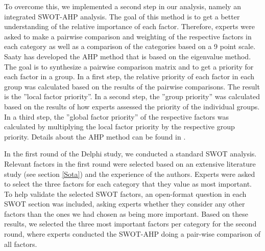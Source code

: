 To overcome this, we implemented a second step in our analysis, namely an integrated SWOT-AHP analysis. The goal of this method is to get a better understanding of the relative importance of each factor. 
Therefore, experts were asked to make a pairwise comparison and weighting of the respective factors in each category as well as a comparison of the categories based on a 9 point scale. 
Saaty \cite{Saaty1980} has developed the AHP method that is based on the eigenvalue method. 
The goal is to synthesize a pairwise comparison matrix and to get a priority for each factor in a group. 
In a first step, the relative priority of each factor in each group was calculated based on the results of the pairwise comparisons. The result is the ''local factor priority''. 
In a second step, the ''group priority'' was calculated based on the results of how experts assessed the priority of the individual groups. 
In a third step, the ''global factor priority'' of the respective factors was calculated by multiplying the local factor priority by the respective group priority. 
Details about the AHP method can be found in \cite{Saaty1980}.

In the first round of the Delphi study, we conducted a standard SWOT analysis. Relevant factors in the first round were selected based on an extensive literature study (see section \ref{Sota}) and the experience of the authors. Experts were asked to select the three factors for each category that they value as most important. 
To help validate the selected SWOT factors, an open-format question in each SWOT section was included, asking experts whether they consider any other factors than the ones we had chosen as being more important. 
Based on these results, we selected the three most important factors per category for the second round, where experts conducted the SWOT-AHP doing a pair-wise comparison of all factors. 


